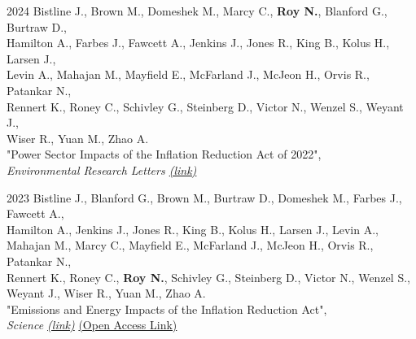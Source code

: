 \documentclass[margin]{res}
\begin{document}
\begin{resume}
2024 \hspace{4mm}%
Bistline J., Brown M., Domeshek M.,  Marcy C.,  \textbf{Roy N.}, Blanford G., Burtraw D., \\
\hspace*{11mm} Hamilton A., Farbes J., Fawcett A., Jenkins J., Jones R., King B., Kolus H., Larsen J.,\\
\hspace*{11mm} Levin A.,  Mahajan M., Mayfield E., McFarland J., McJeon H., Orvis R., Patankar N., \\
\hspace*{11mm} Rennert K., Roney C.,  Schivley G., Steinberg D., Victor N., Wenzel S., Weyant J., \\
\hspace*{11mm} Wiser R., Yuan M., Zhao A. \\
\hspace*{16mm} "Power Sector Impacts of the Inflation Reduction Act of 2022", \\
\hspace*{16mm} \textit{Environmental Research Letters
\href{https://iopscience.iop.org/article/10.1088/1748-9326/ad0d3b} {(link)}}

2023 \hspace{4mm}%
Bistline J., Blanford G., Brown M., Burtraw D., Domeshek M., Farbes J., Fawcett A.,  \\
\hspace*{11mm} Hamilton A., Jenkins J., Jones R., King B., Kolus H., Larsen J., Levin A., \\
\hspace*{11mm} Mahajan M., Marcy C., Mayfield E., McFarland J., McJeon H., Orvis R., Patankar N., \\
\hspace*{11mm} Rennert K., Roney C., \textbf{Roy N.}, Schivley G., Steinberg D., Victor N., Wenzel S., \\
\hspace*{11mm} Weyant J., Wiser R., Yuan M., Zhao A. \\
\hspace*{16mm} "Emissions and Energy Impacts of the Inflation Reduction Act", \\ \hspace*{16mm} \textit{Science  
\href{https://www.science.org/doi/10.1126/science.adg3781} {(link)} }
\href{https://arxiv.org/abs/2307.01443} {(Open Access Link)} 



\end{resume}
\end{document}
